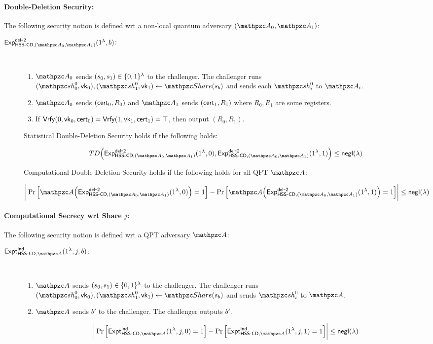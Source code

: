\paragraph{Double-Deletion Security:}

The following security notion is defined wrt a non-local quantum
adversary $(\qA_0, \qA_1)$:

\begin{description}
\item [$\expb{\HSScd, (\qA_0, \qA_1)}{del}{2}(1^\secp, b)$:] $ $
\begin{enumerate}
\item $\qA_0$ sends $(s_0, s_1) \in \{0,1\}^\lambda$ to the challenger.
The challenger runs
$(\qsh_0^0, \vk_0), (\qsh_1^0, \vk_1) \gets \Sh(s_b)$ and sends each
$\qsh_i^0$ to $\qA_i$.

\item $\qA_0$ sends $(\mathsf{cert}_0, R_0)$ and $\qA_{1}$ sends
$(\mathsf{cert}_{1}, R_{1})$ where $R_0, R_1$ are some registers.
\item If $\mathsf{Vrfy}(0, \mathsf{vk}_0, \mathsf{cert}_0) = \mathsf{Vrfy}(1, \mathsf{vk}_1, \mathsf{cert}_1)=
\top$, then output $(R_0, R_1)$.
\end{enumerate}

Statistical Double-Deletion Security holds if the following holds:

$$TD\Big(\expb{\HSScd, (\qA_0, \qA_1)}{del}{2}(1^\secp, 
0), \expb{\HSScd, (\qA_0, \qA_1)}{del}{2}(1^\secp,
1)\Big) \le \negl(\secp)$$

Computational Double-Deletion Security holds if the following holds
for all QPT $\qA$:

$$\bigg\lvert \Pr\Big[\qA\Big(\expb{\HSScd, (\qA_0,
\qA_1)}{del}{2}(1^\secp, 0)\Big)=1\Big] -
\Pr\Big[\qA\Big(\expb{\HSScd, (\qA_0,
\qA_1)}{del}{2}(1^\secp, 1)\Big)=1\Big]
\bigg\rvert \le \negl(\secp)$$

\end{description}

\paragraph{Computational Secrecy wrt Share $j$:}

The following security notion is defined wrt a QPT
adversary $\qA$:

\begin{description}
\item [$\expa{\HSScd, \qA}{ind}(1^\secp, j, b)$:] $ $
\begin{enumerate}
\item $\qA$ sends $(s_0, s_1) \in \{0,1\}^\lambda$
to the challenger. The challenger runs $(\qsh_0^0, \vk_0),
(\qsh_1^0, \vk_1) \leftarrow \Sh(s_b)$ and sends $\qsh_i^0$ to
$\qA$.
\item
$\qA$ sends $b'$ to the challenger. The challenger outputs $b'$.
\end{enumerate}

$$\bigg\lvert \Pr\Big[\expa{\HSScd, \qA}{ind}(1^\secp, j, 0)=1\Big]
-
\Pr\Big[\expa{\HSScd, \qA}{ind}(1^\secp, j, 1)=1\Big]
\bigg\rvert \le \negl(\secp)$$
\end{description}

